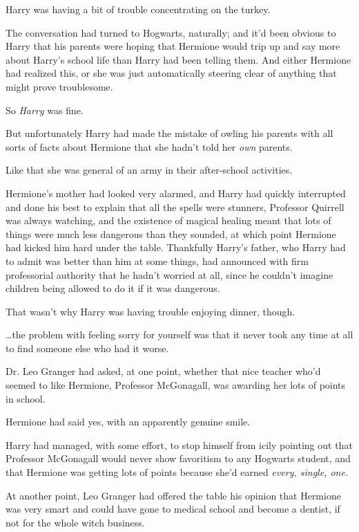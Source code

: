 Harry was having a bit of trouble concentrating on the turkey.

The conversation had turned to Hogwarts, naturally; and it'd been obvious to 
Harry that his parents were hoping that Hermione would trip up and say more 
about Harry's school life than Harry had been telling them. And either Hermione 
had realized this, or she was just automatically steering clear of anything 
that might prove troublesome.

So \emph{Harry} was fine.

But unfortunately Harry had made the mistake of owling his parents with all 
sorts of facts about Hermione that she hadn't told her \emph{own} parents.

Like that she was general of an army in their after-school activities.

Hermione's mother had looked very alarmed, and Harry had quickly interrupted 
and done his best to explain that all the spells were stunners, Professor 
Quirrell was always watching, and the existence of magical healing meant that 
lots of things were much less dangerous than they sounded, at which point 
Hermione had kicked him hard under the table. Thankfully Harry's father, who 
Harry had to admit was better than him at some things, had announced with firm 
professorial authority that he hadn't worried at all, since he couldn't imagine 
children being allowed to do it if it was dangerous.

That wasn't why Harry was having trouble enjoying dinner, though.

{\ldots}the problem with feeling sorry for yourself was that it never took any 
time at all to find someone else who had it worse.

Dr. Leo Granger had asked, at one point, whether that nice teacher who'd seemed 
to like Hermione, Professor McGonagall, was awarding her lots of points in 
school.

Hermione had said yes, with an apparently genuine smile.

Harry had managed, with some effort, to stop himself from icily pointing out 
that Professor McGonagall would never show favoritism to any Hogwarts student, 
and that Hermione was getting lots of points because she'd earned \emph{every, 
single, one.}

At another point, Leo Granger had offered the table his opinion that Hermione 
was very smart and could have gone to medical school and become a dentist, if 
not for the whole witch business.


